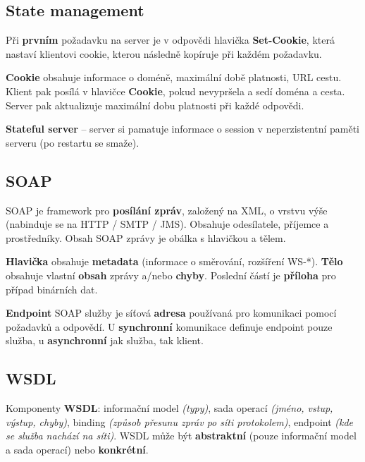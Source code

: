 \subsection{State management}

Při \textbf{prvním} požadavku na server je v odpovědi hlavička \textbf{Set-Cookie}, která nastaví klientovi cookie, kterou následně kopíruje při každém požadavku.

\textbf{Cookie} obsahuje informace o doméně, maximální době platnosti, URL cestu. Klient pak posílá v hlavičce \textbf{Cookie}, pokud nevypršela a sedí doména a cesta. Server pak aktualizuje maximální dobu platnosti při každé odpovědi.

\textbf{Stateful server} -- server si pamatuje informace o session v neperzistentní paměti serveru (po restartu se smaže).

\subsection{SOAP}

SOAP je framework pro \textbf{posílání zpráv}, založený na XML, o vrstvu výše (nabinduje se na HTTP / SMTP / JMS). Obsahuje odesílatele, příjemce a prostředníky. Obsah SOAP zprávy je obálka s hlavičkou a tělem.

\textbf{Hlavička} obsahuje \textbf{metadata} (informace o směrování, rozšíření WS-*). \textbf{Tělo} obsahuje vlastní \textbf{obsah} zprávy a/nebo \textbf{chyby}. Poslední částí je \textbf{příloha} pro případ binárních dat.

\textbf{Endpoint} SOAP služby je síťová \textbf{adresa} používaná pro komunikaci pomocí požadavků a odpovědí. U \textbf{synchronní} komunikace definuje endpoint pouze služba, u \textbf{asynchronní} jak služba, tak klient.

\subsection{WSDL}

Komponenty \textbf{WSDL}: informační model \textit{(typy)}, sada operací \textit{(jméno, vstup, výstup, chyby)}, binding \textit{(způsob přesunu zpráv po síti protokolem)}, endpoint \textit{(kde se služba nachází na síti)}. WSDL může být \textbf{abstraktní} (pouze informační model a sada operací) nebo \textbf{konkrétní}.
